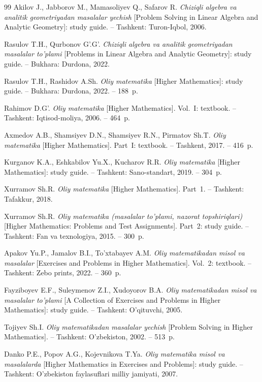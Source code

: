 \begin{thebibliography}{99}
Akilov J., Jabborov M., Mamasoliyev Q., Safarov R. \textit{Chiziqli algebra
va analitik geometriyadan masalalar yechish} [Problem Solving in Linear
Algebra and Analytic Geometry]: study guide. – Tashkent: Turon-Iqbol, 2006.

Rasulov T.H., Qurbonov G’.G’. \textit{Chiziqli algebra va analitik
geometriyadan masalalar to’plami} [Problems in Linear Algebra and Analytic
Geometry]: study guide. – Bukhara: Durdona, 2022.

Rasulov T.H., Rashidov A.Sh. \textit{Oliy matematika} [Higher Mathematics]:
study guide. – Bukhara: Durdona, 2022. – 188~p.

Rahimov D.G’. \textit{Oliy matematika} [Higher Mathematics]. Vol.~I:
textbook. – Tashkent: Iqtisod-moliya, 2006. – 464~p.

Axmedov A.B., Shamsiyev D.N., Shamsiyev R.N., Pirmatov Sh.T.
\textit{Oliy matematika} [Higher Mathematics]. Part~I: textbook. –
Tashkent, 2017. – 416~p.

Kurganov K.A., Eshkabilov Yu.X., Kucharov R.R. \textit{Oliy matematika}
[Higher Mathematics]: study guide. – Tashkent: Sano-standart, 2019. –
304~p.

Xurramov Sh.R. \textit{Oliy matematika} [Higher Mathematics]. Part~1. –
Tashkent: Tafakkur, 2018.

Xurramov Sh.R. \textit{Oliy matematika (masalalar to’plami, nazorat
topshiriqlari)} [Higher Mathematics: Problems and Test Assignments].
Part~2: study guide. – Tashkent: Fan va texnologiya, 2015. – 300~p.

Apakov Yu.P., Jamalov B.I., To’xtabayev A.M. \textit{Oliy matematikadan misol
va masalalar} [Exercises and Problems in Higher Mathematics]. Vol.~2:
textbook. – Tashkent: Zebo prints, 2022. – 360~p.

Fayziboyev E.F., Suleymenov Z.I., Xudoyorov B.A. \textit{Oliy matematikadan
misol va masalalar to’plami} [A Collection of Exercises and Problems in
Higher Mathematics]: study guide. – Tashkent: O’qituvchi, 2005.

Tojiyev Sh.I. \textit{Oliy matematikadan masalalar yechish} [Problem
Solving in Higher Mathematics]. – Tashkent: O’zbekiston, 2002. – 513~p.

Danko P.E., Popov A.G., Kojevnikova T.Ya. \textit{Oliy matematika misol va
masalalarda} [Higher Mathematics in Exercises and Problems]: study guide. –
Tashkent: O’zbekiston faylasuflari milliy jamiyati, 2007.


\end{thebibliography}
